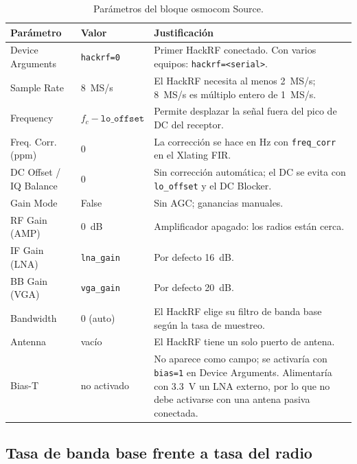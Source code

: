 \documentclass[conference]{IEEEtran}
\begin{document}
\begin{table}[!t]
\centering
\caption{Parámetros del bloque osmocom Source.}
\label{tab:osmo}
\begin{tabular}{>{\raggedright}p{1.9cm}>{\raggedright}p{1.5cm}p{4.1cm}}
\toprule
Parámetro & Valor & Justificación \\
\midrule
Device Arguments & \texttt{hackrf=0} & Primer HackRF conectado. Con varios equipos: \texttt{hackrf=<serial>}. \\
Sample Rate & 8~MS/s & El HackRF necesita al menos 2~MS/s; 8~MS/s es múltiplo entero de 1~MS/s. \\
Frequency & $f_c - \texttt{lo\_offset}$ & Permite desplazar la señal fuera del pico de DC del receptor. \\
Freq. Corr. (ppm) & 0 & La corrección se hace en Hz con \texttt{freq\_corr} en el Xlating FIR. \\
DC Offset / IQ Balance & 0 & Sin corrección automática; el DC se evita con \texttt{lo\_offset} y el DC Blocker. \\
Gain Mode & False & Sin AGC; ganancias manuales. \\
RF Gain (AMP) & 0~dB & Amplificador apagado: los radios están cerca. \\
IF Gain (LNA) & \texttt{lna\_gain} & Por defecto 16~dB. \\
BB Gain (VGA) & \texttt{vga\_gain} & Por defecto 20~dB. \\
Bandwidth & 0 (auto) & El HackRF elige su filtro de banda base según la tasa de muestreo. \\
Antenna & vacío & El HackRF tiene un solo puerto de antena. \\
Bias-T & no activado & No aparece como campo; se activaría con \texttt{bias=1} en Device Arguments. Alimentaría con 3.3~V un LNA externo, por lo que no debe activarse con una antena pasiva conectada. \\
\bottomrule
\end{tabular}
\end{table}

\subsection{Tasa de banda base frente a tasa del radio}
\end{document}
